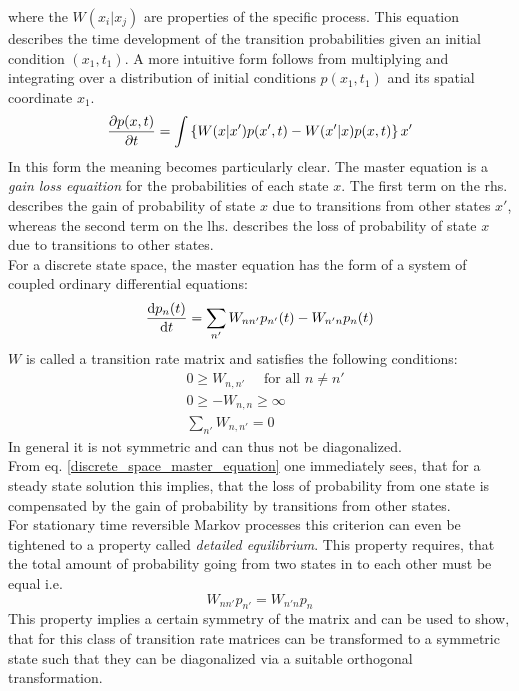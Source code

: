 where the $W(x_i|x_j)$ are properties of the specific process.
This equation describes the time development of the transition probabilities given an initial condition $(x_1,t_1)$. A more intuitive form follows from multiplying and integrating over a distribution of initial conditions $p(x_1,t_1)$ and its spatial coordinate $x_1$.
\begin{equation}
    \frac{\partial p(x,t)}{\partial t} = \int \left\{ W(x|x') p(x',t) - W(x'|x)p(x,t) \right\} {\rm } x'
\end{equation}
In this form the meaning becomes particularly clear. The master equation is a \textit{gain loss equaition} for the probabilities of each state $x$. The first term on the rhs. describes the gain of probability of state $x$ due to transitions from other states $x'$, whereas the second term on the lhs. describes the loss of probability of state $x$ due to transitions to other states.\\
For a discrete state space, the master equation has the form of a system of coupled ordinary differential equations:
\begin{equation}
    \frac{{\rm d} p_n(t)}{{\rm d} t} = \sum_{n'} W_{n n'}p_{n'}(t) - W_{n'n}p_{n}(t)
    \label{discrete_space_master_equation}
\end{equation}
$W$ is called a transition rate matrix and satisfies the following conditions:
\begin{align*}
    &0 \ge W_{n,n'} \quad \mbox{ for all } n \ne n' \\
    &0 \ge -W_{n,n} \ge \infty \\
    &\sum_{n'} W_{n,n'} = 0
    \label{Transitions_rate_matrix}
\end{align*}
In general it is not symmetric and can thus not be diagonalized. \\
From eq. \eqref{discrete_space_master_equation} one immediately sees, that for a steady state solution this implies, that the loss of probability from one state is compensated by the gain of probability by transitions from other states.\\
For stationary time reversible Markov processes this criterion can even be tightened to a property called \textit{detailed equilibrium}.
This property requires, that the total amount of probability going from two states in to each other must be equal i.e.
\begin{equation}
     W_{n n'}p_{n'} = W_{n'n}p_{n}
    \label{detailed_balance}
\end{equation}
This property implies a certain symmetry of the matrix and can be used to show, that for this class of transition rate matrices can be transformed to a symmetric state such that they can be diagonalized via a suitable orthogonal transformation.
